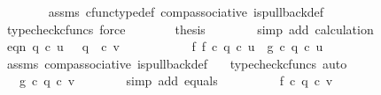 \begin{isabellebody}
\ \ \ \ \ \ \isamarkupfalse%
\ assms{\isacharparenleft}{\kern0pt}{}{\isacharparenright}{\kern0pt}\ cfunc{\isacharunderscore}{\kern0pt}type{\isacharunderscore}{\kern0pt}def\ comp{\isacharunderscore}{\kern0pt}associative\ is{\isacharunderscore}{\kern0pt}pullback{\isacharunderscore}{\kern0pt}def\ \isamarkupfalse%
\ {\isacharparenleft}{\kern0pt}typecheck{\isacharunderscore}{\kern0pt}cfuncs{\isacharcomma}{\kern0pt}\ force{\isacharparenright}{\kern0pt}\isanewline
\ \ \ \ \isamarkupfalse%
\ \isamarkupfalse%
\ {\isacharquery}{\kern0pt}thesis\isanewline
\ \ \ \ \ \ \isamarkupfalse%
\ {\isacharparenleft}{\kern0pt}simp\ add{\isacharcolon}{\kern0pt}\ calculation{\isacharparenright}{\kern0pt}\isanewline
\ \ \isamarkupfalse%
\ \isanewline
\isanewline
\ \ \isamarkupfalse%
\ eqn{}{\isacharcolon}{\kern0pt}\ {\isachardoublequoteopen}q{}\ {\isasymcirc}\isactrlsub c\ u\ {\isacharequal}{\kern0pt}\ \ q{}\ \ {\isasymcirc}\isactrlsub c\ v{\isachardoublequoteclose}\isanewline
\ \ \isamarkupfalse%
\ {\isacharminus}{\kern0pt}\ \isanewline
\ \ \ \ \isamarkupfalse%
\ f{}{\isacharcolon}{\kern0pt}\ {\isachardoublequoteopen}f\ {\isasymcirc}\isactrlsub c\ q{}\ {\isasymcirc}\isactrlsub c\ u\ {\isacharequal}{\kern0pt}\ g\ {\isasymcirc}\isactrlsub c\ q{}\ {\isasymcirc}\isactrlsub c\ u{\isachardoublequoteclose}\isanewline
\ \ \ \ \ \ \isamarkupfalse%
\ assms{\isacharparenleft}{\kern0pt}{}{\isacharparenright}{\kern0pt}\ comp{\isacharunderscore}{\kern0pt}associative{}\ is{\isacharunderscore}{\kern0pt}pullback{\isacharunderscore}{\kern0pt}def\ \ \isamarkupfalse%
\ {\isacharparenleft}{\kern0pt}typecheck{\isacharunderscore}{\kern0pt}cfuncs{\isacharcomma}{\kern0pt}\ auto{\isacharparenright}{\kern0pt}\isanewline
\ \ \ \ \isamarkupfalse%
\ \isamarkupfalse%
\ {\isachardoublequoteopen}{\isachardot}{\kern0pt}{\isachardot}{\kern0pt}{\isachardot}{\kern0pt}\ {\isacharequal}{\kern0pt}\ g\ {\isasymcirc}\isactrlsub c\ q{}\ {\isasymcirc}\isactrlsub c\ v{\isachardoublequoteclose}\isanewline
\ \ \ \ \ \ \isamarkupfalse%
\ {\isacharparenleft}{\kern0pt}simp\ add{\isacharcolon}{\kern0pt}\ equals{\isacharparenright}{\kern0pt}\isanewline
\ \ \ \ \isamarkupfalse%
\ \isamarkupfalse%
\ {\isachardoublequoteopen}{\isachardot}{\kern0pt}{\isachardot}{\kern0pt}{\isachardot}{\kern0pt}\ {\isacharequal}{\kern0pt}\ f\ {\isasymcirc}\isactrlsub c\ q{}\ {\isasymcirc}\isactrlsub c\ v{\isachardoublequoteclose}\isanewline

\end{isabellebody}
